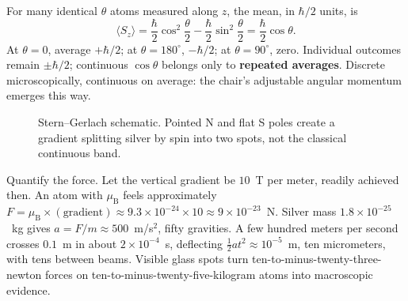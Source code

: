 For many identical $\theta$ atoms measured along $z$, the mean, in $\hbar/2$ units, is
\[
\langle S_z\rangle=\frac{\hbar}{2}\cos^{2}\frac{\theta}{2}-\frac{\hbar}{2}\sin^{2}\frac{\theta}{2}
=\frac{\hbar}{2}\cos\theta .
\]
At $\theta=0$, average $+\hbar/2$; at $\theta=180^\circ$, $-\hbar/2$; at $\theta=90^\circ$, zero. Individual outcomes remain $\pm\hbar/2$; continuous $\cos\theta$ belongs only to \textbf{repeated averages}. Discrete microscopically, continuous on average: the chair's adjustable angular momentum emerges this way.

\begin{figure}[htbp]
\centering
{}
\caption{Stern--Gerlach schematic. Pointed N and flat S poles create a gradient splitting silver by spin into two spots, not the classical continuous band.}
\end{figure}

Quantify the force. Let the vertical gradient be $10$~T per meter, readily achieved then. An atom with $\mu_{\mathrm B}$ feels approximately $F=\mu_{\mathrm B}\times(\text{gradient})\approx9.3\times10^{-24}\times10\approx9\times10^{-23}$~N. Silver mass $1.8\times10^{-25}$~kg gives $a=F/m\approx500$~m/s$^2$, fifty gravities. A few hundred meters per second crosses $0.1$~m in about $2\times10^{-4}$~s, deflecting $\tfrac12 a t^{2}\approx10^{-5}$~m, ten micrometers, with tens between beams. Visible glass spots turn ten-to-minus-twenty-three-newton forces on ten-to-minus-twenty-five-kilogram atoms into macroscopic evidence.

